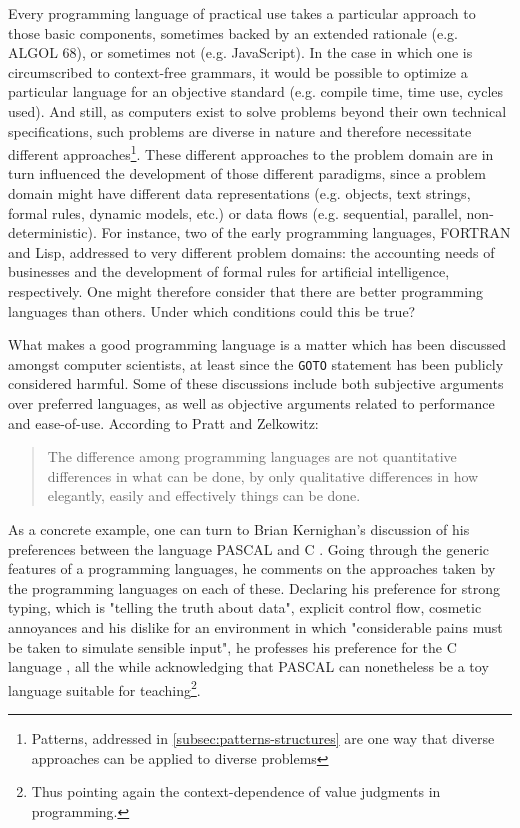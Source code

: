 Every programming language of practical use takes a particular approach to those basic components, sometimes backed by an extended rationale (e.g. ALGOL 68), or sometimes not (e.g. JavaScript). In the case in which one is circumscribed to context-free grammars, it would be possible to optimize a particular language for an objective standard (e.g. compile time, time use, cycles used). And still, as computers exist to solve problems beyond their own technical specifications, such problems are diverse in nature and therefore necessitate different approaches\footnote{Patterns, addressed in \ref{subsec:patterns-structures} are one way that diverse approaches can be applied to diverse problems}. These different approaches to the problem domain are in turn influenced the development of those different paradigms, since a problem domain might have different data representations (e.g. objects, text strings, formal rules, dynamic models, etc.) or data flows (e.g. sequential, parallel, non-deterministic). For instance, two of the early programming languages, FORTRAN and Lisp, addressed to very different problem domains: the accounting needs of businesses and the development of formal rules for artificial intelligence, respectively. One might therefore consider that there are better programming languages than others. Under which conditions could this be true?

What makes a good programming language is a matter which has been discussed amongst computer scientists, at least since the \lstinline{GOTO} statement has been publicly considered harmful. Some of these discussions include both subjective arguments over preferred languages, as well as objective arguments related to performance and ease-of-use. According to Pratt and Zelkowitz:

\begin{quote}
  The difference among programming languages are not quantitative differences in what can be done, by only qualitative differences in how elegantly, easily and effectively things can be done. \citep{pratt_programming_2000}
\end{quote}

As a concrete example, one can turn to Brian Kernighan's discussion of his preferences between the language PASCAL and C \citep{kernighan_why_1981}. Going through the generic features of a programming languages, he comments on the approaches taken by the programming languages on each of these. Declaring his preference for strong typing, which is "telling the truth about data", explicit control flow, cosmetic annoyances and his dislike for an environment in which "considerable pains must be taken to simulate sensible input", he professes his preference for the C language \citep{kernighan_why_1981}, all the while acknowledging that PASCAL can nonetheless be a toy language suitable for teaching\footnote{Thus pointing again the context-dependence of value judgments in programming.}.

